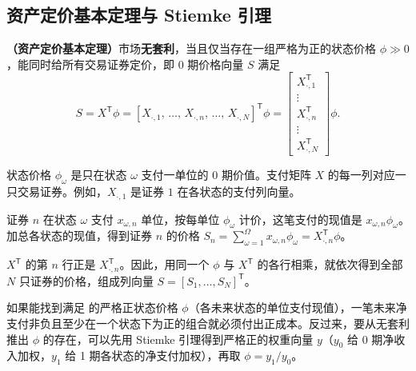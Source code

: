 \subsection{资产定价基本定理与 Stiemke 引理}
\begin{tcolorbox}[knowledge]
\textbf{（资产定价基本定理）}市场\textbf{无套利}，当且仅当存在一组严格为正的状态价格 $\phi\gg0$，能同时给所有交易证券定价，即 0 期价格向量 $S$ 满足
\begin{equation}
    S=X^{\mathsf T}\phi
    =[X_{\cdot,1},\,\ldots,\,X_{\cdot,n},\,\ldots,\,X_{\cdot,N}]^{\mathsf T}\phi
    =\begin{bmatrix}
        X_{\cdot,1}^{\mathsf T}\\
        \vdots\\
        X_{\cdot,n}^{\mathsf T}\\
        \vdots\\
        X_{\cdot,N}^{\mathsf T}
    \end{bmatrix}\phi.
 \label{eq:wj-four-6}
\end{equation}

状态价格 $\phi_\omega$ 是只在状态 $\omega$ 支付一单位的 0 期价值。支付矩阵 $X$ 的每一列对应一只交易证券。例如，$X_{\cdot,1}$ 是证券 $1$ 在各状态的支付列向量。

证券 $n$ 在状态 $\omega$ 支付 $x_{\omega,n}$ 单位，按每单位 $\phi_\omega$ 计价，这笔支付的现值是 $x_{\omega,n}\phi_\omega$。加总各状态的现值，得到证券 $n$ 的价格 $S_n=\sum_{\omega=1}^{\Omega}x_{\omega,n}\phi_\omega=X_{\cdot,n}^{\mathsf T}\phi$。

$X^{\mathsf T}$ 的第 $n$ 行正是 $X_{\cdot,n}^{\mathsf T}$。因此，用同一个 $\phi$ 与 $X^{\mathsf T}$ 的各行相乘，就依次得到全部 $N$ 只证券的价格，组成列向量 $S=[S_1,\ldots,S_N]^{\mathsf T}$。
\end{tcolorbox}

如果能找到满足 的严格正状态价格 $\phi$（各未来状态的单位支付现值），一笔未来净支付非负且至少在一个状态下为正的组合就必须付出正成本。反过来，要从无套利推出 $\phi$ 的存在，可以先用 Stiemke 引理得到严格正的权重向量 $y$（$y_0$ 给 0 期净收入加权，$y_1$ 给 1 期各状态的净支付加权），再取 $\phi=y_1/y_0$。

\newsavebox{\WJStiemkeFigure}

